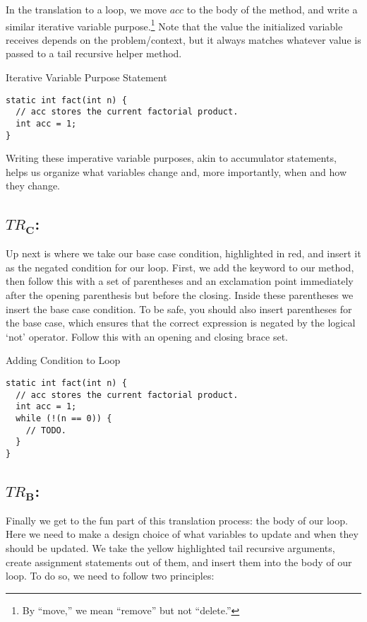In the translation to a loop, we move $\textit{acc}$ to the body of the method, and write a similar iterative variable purpose.\footnote{By ``move,'' we mean ``remove'' but not ``delete.''} Note that the value the initialized variable receives depends on the problem/context, but it always matches whatever value is passed to a tail recursive helper method.

\begin{cl}[]{Iterative Variable Purpose Statement}
\begin{lstlisting}[language=MyJava]
static int fact(int n) {
  // acc stores the current factorial product. 
  int acc = 1;
}
\end{lstlisting}
\end{cl}

Writing these imperative variable purposes, akin to accumulator statements, helps us organize what variables change and, more importantly, when and how they change. 

\subsection*{\textit{$TR_\mathbf{C}$}:} Up next is where we take our base case condition, highlighted in red, and insert it as the negated condition for our loop. First, we add the  keyword to our method, then follow this with a set of parentheses and an exclamation point immediately after the opening parenthesis but before the closing. Inside these parentheses we insert the base case condition. To be safe, you should also insert parentheses for the base case, which ensures that the correct expression is negated by the logical `not' operator. Follow this with an opening and closing brace set.

\begin{cl}[]{Adding Condition to Loop}
\begin{lstlisting}[language=MyJava]
static int fact(int n) {
  // acc stores the current factorial product. 
  int acc = 1;
  while (!(n == 0)) { 
    // TODO.
  }
}
\end{lstlisting}
\end{cl}

\subsection*{\textit{$TR_\mathbf{B}$}:} Finally we get to the fun part of this translation process: the body of our loop. Here we need to make a design choice of what variables to update and when they should be updated. We take the \textcolor{darkyellow}{yellow} highlighted tail recursive arguments, create assignment statements out of them, and insert them into the body of our loop. To do so, we need to follow two principles:

